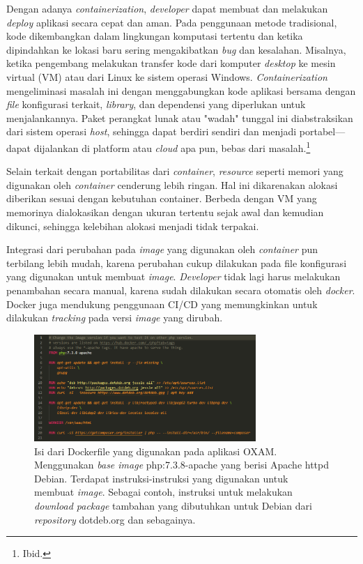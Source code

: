 \documentclass[a4paper,twoside]{article}
\begin{document}
\begin{enumerate}
\begin{itemize}
\begin{itemize}
        		\setlength\parindent{24pt}
        		Dengan adanya \textit{containerization}, \textit{developer} dapat membuat dan melakukan \textit{deploy} aplikasi secara cepat dan aman. Pada penggunaan metode tradisional, kode dikembangkan dalam lingkungan komputasi tertentu dan ketika dipindahkan ke lokasi baru sering mengakibatkan \textit{bug} dan kesalahan. Misalnya, ketika pengembang melakukan transfer kode dari komputer \textit{desktop} ke mesin virtual (VM) atau dari Linux ke sistem operasi Windows. \textit{Containerization} mengeliminasi masalah ini dengan menggabungkan kode aplikasi bersama dengan \textit{file} konfigurasi terkait, \textit{library}, dan dependensi yang diperlukan untuk menjalankannya. Paket perangkat lunak atau "wadah" tunggal ini diabstraksikan dari sistem operasi \textit{host}, sehingga dapat berdiri sendiri dan menjadi portabel—dapat dijalankan di platform atau \textit{cloud} apa pun, bebas dari masalah.\footnote{Ibid.}
        		
        		Selain terkait dengan portabilitas dari \textit{container}, \textit{resource} seperti memori yang digunakan oleh \textit{container} cenderung lebih ringan. Hal ini dikarenakan alokasi diberikan sesuai dengan kebutuhan container. Berbeda dengan VM yang memorinya dialokasikan dengan ukuran tertentu sejak awal dan kemudian dikunci, sehingga kelebihan alokasi menjadi tidak terpakai.
        		
                Integrasi dari perubahan pada \textit{image} yang digunakan oleh \textit{container} pun terbilang lebih mudah, karena perubahan cukup dilakukan pada file konfigurasi yang digunakan untuk membuat \textit{image}. \textit{Developer} tidak lagi harus melakukan penambahan secara manual, karena sudah dilakukan secara otomatis oleh \textit{docker}. Docker juga mendukung penggunaan CI/CD yang memungkinkan untuk dilakukan \textit{tracking} pada versi \textit{image} yang dirubah.
                
                	\begin{figure}[H]
                    \centering
                    \includegraphics[width=0.75\textwidth]{images/dockerfile.PNG}
                    \caption{Isi dari Dockerfile yang digunakan pada aplikasi OXAM. Menggunakan \textit{base image} php:7.3.8-apache yang berisi Apache httpd Debian. Terdapat instruksi-instruksi yang digunakan untuk membuat \textit{image}. Sebagai contoh, instruksi untuk melakukan \textit{download package} tambahan yang dibutuhkan untuk Debian dari \textit{repository} dotdeb.org dan sebagainya.}
                    \label{fig:dockerfile}
                \end{figure}
                

\end{itemize}
\end{itemize}
\end{enumerate}
\end{document}
